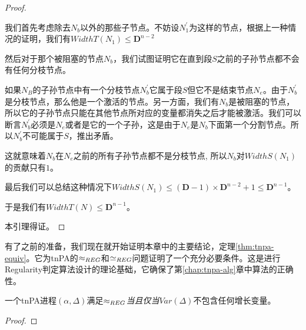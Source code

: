 \begin{proof}
\begin{enumerate}
\begin{enumerate}
我们首先考虑除去$N_b$以外的那些子节点。不妨设$N_1^{'}$为这样的节点，根据上一种情况的证明，我们有$WidthT(N_1)\leq\mathbf{D}^{n-2}$

然后对于那个被阻塞的节点$N_b$，我们试图证明它在直到段$S$之前的子孙节点都不会有任何分枝节点。

如果$N_B$的子孙节点中有一个分枝节点$N_b^{'}$它属于段$S$但它不是结束节点$N_e$。由于$N_b^{'}$是分枝节点，那么他是一个激活的节点。另一方面，我们有$N_b$是被阻塞的节点，所以它的子孙节点只能在其他节点所对应的变量都消失之后才能被激活。我们可以断言$N_b^{'}$必须是$N_e$或者是它的一个子孙，这是由于$N_e$是$N_b$下面第一个分割节点。所以$N_b^{'}$不可能属于$S$，推出矛盾。

这就意味着$N_b$在$N_e$之前的所有子孙节点都不是分枝节点, 所以$N_b$对$WidthS(N_1)$的贡献只有$1$。

最后我们可以总结这种情况下$WidthS(N_1)\leq (\mathbf{D}-1)\times \mathbf{D}^{n-2}+1\leq \mathbf{D}^{n-1}$。
\end{enumerate}
于是我们有$WidthT(N)\leq \mathbf{D}^{n-1}$。
\end{enumerate}
本引理得证。
\end{proof}

有了之前的准备，我们现在就开始证明本章中的主要结论，定理\ref{thm:tnpa-equiv}。它为tnPA的$\approx_{REG}$和$\simeq_{REG}$问题证明了一个充分必要条件。这是进行Regularity判定算法设计的理论基础，它确保了第\ref{chap:tnpa-alg}章中算法的正确性。

\begin{thm}\label{thm:tnpa-equiv}
一个tnPA进程$(\alpha,\Delta)$满足$\approx_{REG}$\emph{当且仅当}$Var(\Delta)$不包含任何增长变量。
\end{thm}

\begin{proof}

\end{proof}
